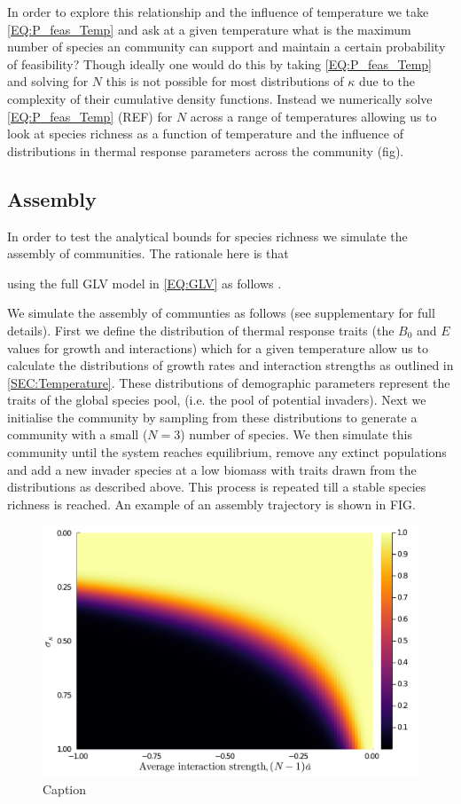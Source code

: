 \documentclass{article}
\begin{document}
In order to explore this relationship and the influence of temperature we take \cref{EQ:P_feas_Temp} and ask at a given temperature what is the maximum number of species an community can support and maintain a certain probability of feasibility? Though ideally one would do this by taking \cref{EQ:P_feas_Temp} and solving for $N$ this is not possible for most distributions of $\kappa$ due to the complexity of their cumulative density functions. Instead we numerically solve \cref{EQ:P_feas_Temp} (REF) for $N$ across a range of temperatures allowing us to look at species richness as a function of temperature and the influence of distributions in thermal response parameters across the community (fig).

\subsection{Assembly}

In order to test the analytical bounds for species richness we simulate the assembly of communities. The rationale here is that 

using the full GLV model in \cref{EQ:GLV} as follows . 

We simulate the assembly of communties as follows (see supplementary for full details). First we define the distribution of thermal response traits (the $B_0$ and $E$ values for growth and interactions) which for a given temperature allow us to calculate the distributions of growth rates and interaction strengths as outlined in \cref{SEC:Temperature}. These distributions of demographic parameters represent the traits of the global species pool, (i.e. the pool of potential invaders). Next we initialise the community by sampling from these distributions to generate a community with a small ($N=3$) number of species. We then simulate this community until the system reaches equilibrium, remove any extinct populations and add a new invader species at a low biomass with traits drawn from the distributions as described above. This process is repeated till a stable species richness is reached. An example of an assembly trajectory is shown in FIG. 

\begin{figure}
    \centering
    \includegraphics[width = \textwidth]{docs/Figures/Fig_2.pdf}
    \caption{Caption}
    \label{Fig:Assembly_Example}
\end{figure}
\end{document}
